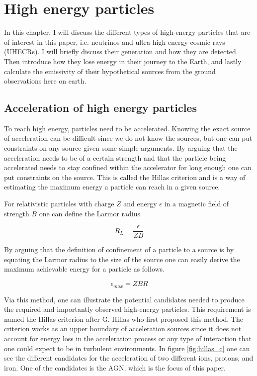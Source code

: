 \section{High energy particles}

In this chapter, I will discuss the different types of high-energy particles that are of interest in this paper, i.e. neutrinos and ultra-high energy cosmic rays (UHECRs).
I will briefly discuss their generation and how they are detected. Then introduce how they lose energy in their journey to the Earth, and lastly calculate the emissivity of their hypothetical sources from the ground 
observations here on earth. 

\subsection{Acceleration of high energy particles}

To reach high energy, particles need to be accelerated. 
Knowing the exact source of acceleration can be difficult since we do not know the sources, but one can put constraints on any source given some simple arguments.
By arguing that the acceleration needs to be of a certain strength and that the particle being accelerated needs to stay confined within the accelerator for long enough one can put constraints on the source.
This is called the Hillas criterion  and is a way of estimating the maximum energy a particle can reach in a given source.%

For relativistic particles with charge $Z$ and energy $\epsilon$ in a magnetic field of strength $B$ one can define the Larmor radius


\begin{equation}
    R_L = \frac{\epsilon}{ZB}
\end{equation}

By arguing that the definition of confinement of a particle to a source is by equating the Larmor radius to the size of the source one can 
easily derive the maximum achievable energy for a particle as follows.%

\begin{equation}
    \epsilon_{max} = ZBR
\end{equation}

Via this method, one can illustrate the potential candidates needed to produce the required and importantly observed high-energy particles. 
This requirement is named the Hillas criterion after G. Hillas who first proposed this method\cite{Hillas_1984}.
The criterion works as an upper boundary of acceleration sources since it does not account for energy loss in the acceleration process or any type of interaction that one could expect to be in turbulent environments.
In figure \ref{fig:hillas_c} one can see the different candidates for the acceleration of two different ions, protons, and iron. One of the candidates is the AGN, which is the focus of this paper.

